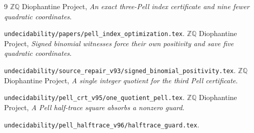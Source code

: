 \documentclass[11pt]{article}
\begin{document}
\begin{thebibliography}{9}
\small\setlength{\itemsep}{2pt}
 \(\mathbb Z\mathbb Q\) Diophantine Project,
\emph{An exact three-Pell index certificate and nine fewer quadratic
coordinates}.\par
\nolinkurl{undecidability/papers/pell_index_optimization.tex}.
 \(\mathbb Z\mathbb Q\) Diophantine Project,
\emph{Signed binomial witnesses force their own positivity and save
five quadratic coordinates}.\par
\nolinkurl{undecidability/source_repair_v93/signed_binomial_positivity.tex}.
 \(\mathbb Z\mathbb Q\) Diophantine Project,
\emph{A single integer quotient for the third Pell certificate}.\par
\nolinkurl{undecidability/pell_crt_v95/one_quotient_pell.tex}.
 \(\mathbb Z\mathbb Q\) Diophantine Project,
\emph{A Pell half-trace square absorbs a nonzero guard}.\par
\nolinkurl{undecidability/pell_halftrace_v96/halftrace_guard.tex}.
\end{thebibliography}
\end{document}
